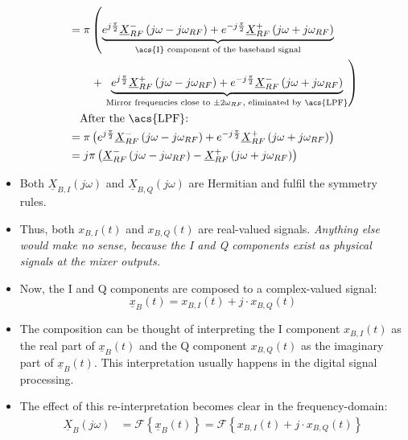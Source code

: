 \begin{refsection}
\begin{itemize}
\begin{equation}
\begin{split}
			 &= \pi \left(\underbrace{e^{j\frac{\pi}{2}} \underline{X}_{RF}^{-}\left(j\omega-j\omega_{RF}\right) + e^{-j\frac{\pi}{2}} \underline{X}_{RF}^{+}\left(j\omega+j\omega_{RF}\right)}_{\text{\acs{I} component of the baseband signal}} \right. \\ &\qquad + \left. \underbrace{e^{j\frac{\pi}{2}} \underline{X}_{RF}^{+}\left(j\omega-j\omega_{RF}\right) + e^{-j\frac{\pi}{2}} \underline{X}_{RF}^{-}\left(j\omega+j\omega_{RF}\right)}_{\text{Mirror frequencies close to $\pm 2 \omega_{RF}$, eliminated by \acs{LPF}}} \right) \\
			 &\quad \text{After the \acs{LPF}:} \\
			 &= \pi \left(e^{j\frac{\pi}{2}} \underline{X}_{RF}^{-}\left(j\omega-j\omega_{RF}\right) + e^{-j\frac{\pi}{2}} \underline{X}_{RF}^{+}\left(j\omega+j\omega_{RF}\right) \right) \\
			 &= j \pi \left( \underline{X}_{RF}^{-}\left(j\omega-j\omega_{RF}\right) - \underline{X}_{RF}^{+}\left(j\omega+j\omega_{RF}\right) \right)
		\end{split}
	\end{equation}
	\item Both $\underline{X}_{B,I}\left(j\omega\right)$ and $\underline{X}_{B,Q}\left(j\omega\right)$ are Hermitian and fulfil the symmetry rules.
	\item Thus, both $x_{B,I}(t)$ and $x_{B,Q}(t)$ are real-valued signals. \textit{Anything else would make no sense, because the \ac{I} and \ac{Q} components exist as physical signals at the mixer outputs.}
	\item Now, the \ac{I} and \ac{Q} components are composed to a complex-valued signal:
	\begin{equation}
		\underline{x}_B(t) = x_{B,I}(t) + j \cdot x_{B,Q}(t)
	\end{equation}
	\item The composition can be thought of interpreting the \ac{I} component $x_{B,I}(t)$ as the real part of $\underline{x}_B(t)$ and the \ac{Q} component $x_{B,Q}(t)$ as the imaginary part of $\underline{x}_B(t)$. This interpretation usually happens in the digital signal processing.
	\item The effect of this re-interpretation becomes clear in the frequency-domain:
	\begin{equation}
		\begin{split}
			\underline{X}_{B}\left(j\omega\right) &= \mathcal{F}\left\{\underline{x}_B(t)\right\} = \mathcal{F}\left\{x_{B,I}(t) + j \cdot x_{B,Q}(t)\right\} \\

\end{split}
\end{equation}
\end{itemize}
\end{refsection}
